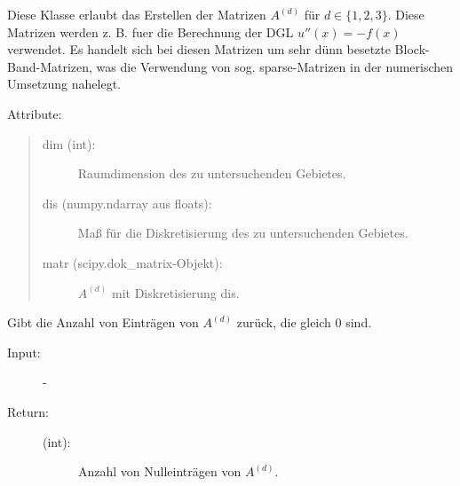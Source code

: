 \documentclass[letterpaper,10pt,ngerman, oneside, openright]{sphinxmanual}
\begin{document}
\begin{fulllineitems}
\label{\detokenize{index:sparse_erw.Sparse}}
Diese Klasse erlaubt das Erstellen der Matrizen $A^{(d)}$ für $d \in \{1,2,3\}$. Diese Matrizen werden
z. B. fuer die Berechnung der DGL $u''(x)=-f(x)$ verwendet. Es handelt sich bei diesen Matrizen
um sehr dünn besetzte Block-Band-Matrizen, was die Verwendung von sog. sparse-Matrizen
in der numerischen Umsetzung nahelegt.

Attribute:
\begin{quote}
\begin{description}
\item[{dim (int):}] \leavevmode
Raumdimension des zu untersuchenden Gebietes.

\item[{dis (numpy.ndarray aus floats):}] \leavevmode
Maß für die Diskretisierung des zu untersuchenden Gebietes.

\item[{matr (scipy.dok\_matrix-Objekt):}] \leavevmode
$A^{(d)}$ mit Diskretisierung dis.

\end{description}
\end{quote}

\begin{fulllineitems}
\label{\detokenize{index:sparse_erw.Sparse.anz_n_abs}}
Gibt die Anzahl von Einträgen von $A^{(d)}$ zurück, die gleich 0 sind.

\begin{description}
\item [{Input:}] -
\end{description}

\begin{description}
\item[{Return:}] \leavevmode\begin{description}
\item[{(int):}] \leavevmode
Anzahl von Nulleinträgen von $A^{(d)}$.

\end{description}

\end{description}

\end{fulllineitems}


\end{fulllineitems}
\end{document}
